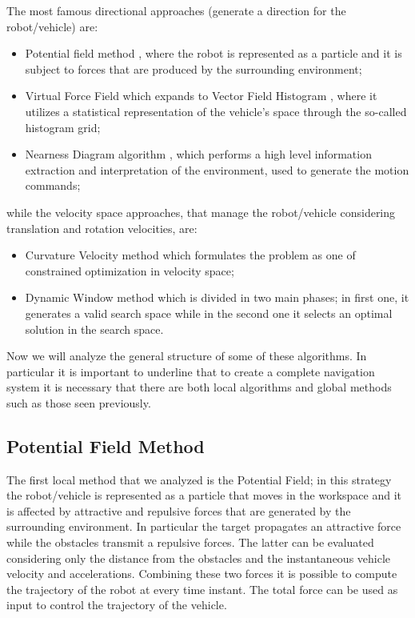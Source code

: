 The most famous directional approaches (generate a direction for the robot/vehicle) are:
\begin{itemize}
	\item Potential field method \cite{Khatib1986}, where the robot is represented as a particle and it is subject to forces that are produced by the surrounding environment;
	\item Virtual Force Field which expands to Vector Field Histogram \cite{Borenstein1991}, where it utilizes a statistical representation of the vehicle's space through the so-called histogram grid;
	\item Nearness Diagram algorithm \cite{Montano2000}, which  performs a high level information extraction and interpretation of the environment, used to generate the motion commands;
\end{itemize}
while the velocity space approaches, that manage the robot/vehicle considering translation and rotation velocities, are:
\begin{itemize}
	\item Curvature Velocity method \cite{Simmons1996} which formulates the problem as one of constrained optimization in velocity space;
	\item Dynamic Window method \cite{Fox1997} which is divided in two main phases; in first one, it generates a valid search space while in the second one it selects an optimal solution in the search space.
\end{itemize}
Now we will analyze the general structure of some of these algorithms. In particular it is important to underline that to create a complete navigation system it is necessary that there are both local algorithms and global methods such as those seen previously.

\subsection{Potential Field Method}
The first local method that we analyzed is the Potential Field; in this strategy the robot/vehicle is represented as a particle that moves in the workspace and it is affected by attractive and repulsive forces that are generated by the surrounding environment. In particular the target propagates an attractive force while the obstacles transmit a repulsive forces. The latter can be evaluated considering only the distance from the obstacles and the instantaneous vehicle velocity and accelerations. Combining these two forces it is possible to compute the trajectory of the robot at every time instant. The total force can be used as input to control the trajectory of the vehicle.
